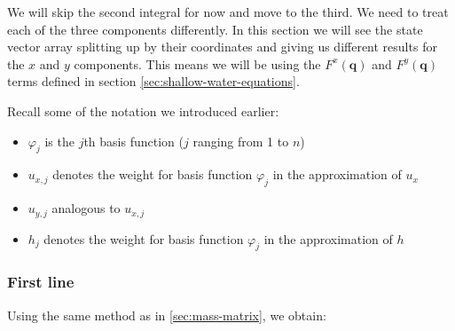 \documentclass[a4paper, twoside]{article}
\renewcommand{\phi}{\varphi}
\begin{document}
We will skip the second integral for now and move to the third. We need to treat each of the three components differently. In this section we will see the state vector array splitting up by their coordinates and giving us different results for the $x$ and $y$ components. This means we will be using the $F^x\left(\mathbf{q}\right)$ and $F^y\left(\mathbf{q}\right)$ terms defined in section \ref{sec:shallow-water-equations}.

Recall some of the notation we introduced earlier:
\begin{itemize}
\item $\phi_j$ is the $j$th basis function ($j$ ranging from 1 to $n$)
\item $u_{x,j}$ denotes the weight for basis function $\phi_j$ in the approximation of $u_x$
\item $u_{y,j}$ analogous to $u_{x,j}$
\item $h_j$ denotes the weight for basis function $\phi_j$ in the approximation of $h$
\end{itemize}

\subsubsection{First line}
\label{sec:stiffness-matrix-first-line}

Using the same method as in \ref{sec:mass-matrix}, we obtain:
\end{document}
